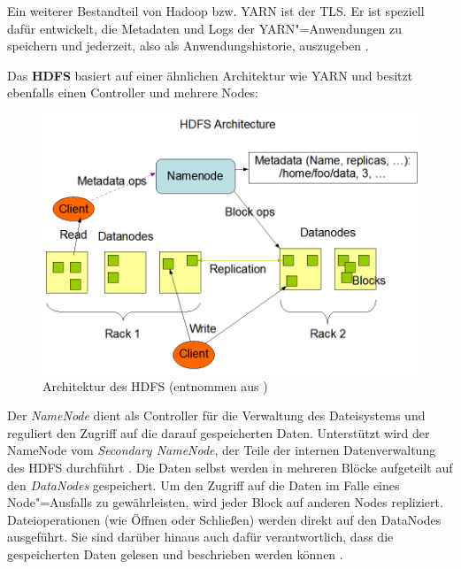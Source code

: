 Ein weiterer Bestandteil von Hadoop bzw. \ac{YARN} ist der \ac{TLS}.
Er ist speziell dafür entwickelt, die Metadaten und Logs der \ac{YARN}"=Anwendungen zu speichern und jederzeit, also als Anwendungshistorie, auszugeben \cite{HadoopYarnTlServer271}.

Das \textbf{\ac{HDFS}} basiert auf einer ähnlichen Architektur wie \ac{YARN} und besitzt ebenfalls einen Controller und mehrere Nodes:

\begin{figure}[h]
    \includegraphics{./images/hdfsarchitecture.png}
    \caption[Architektur des HDFS]
    {Architektur des \acs{HDFS} (entnommen aus \cite{HadoopHdfsDesc271})}
    \label{fig:hdfsarch}
\end{figure}

Der \emph{NameNode} dient als Controller für die Verwaltung des Dateisystems und reguliert den Zugriff auf die darauf gespeicherten Daten.
Unterstützt wird der NameNode vom \emph{Secondary NameNode}, der Teile der internen Datenverwaltung des \ac{HDFS} durchführt \cite{HadoopHdfsGuide271}.
Die Daten selbst werden in mehreren Blöcke aufgeteilt auf den \emph{DataNodes} gespeichert.
Um den Zugriff auf die Daten im Falle eines Node"=Ausfalls zu gewährleisten, wird jeder Block auf anderen Nodes repliziert.
Dateioperationen (wie Öffnen oder Schließen) werden direkt auf den DataNodes ausgeführt.
Sie sind darüber hinaus auch dafür verantwortlich, dass die gespeicherten Daten gelesen und beschrieben werden können \cite{HadoopHdfsDesc271}.
